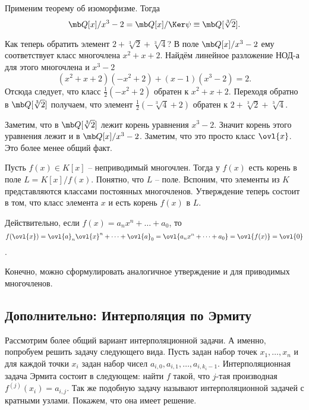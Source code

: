 Применим теорему об изоморфизме. Тогда $$\mb Q[x]/x^3-2= \mb Q[x]/\Ker \psi \equiv \mb Q[\sqrt[3]{2}].$$

Как теперь обратить элемент $2+\sqrt[3]{2} + \sqrt[3]{4}$? В поле  $\mb Q[x]/x^3-2$ ему соответствует класс многочлена $x^2+x+2$. Найдём линейное разложение НОД-а для этого многочлена и $x^3-2$ 
$$(x^2+x+2)(-x^2+2)+(x-1)(x^3-2)=2.$$
Отсюда следует, что класс $\frac{1}{2}(-x^2+2)$ обратен к $x^2+x+2$. Переходя обратно в $\mb Q[\sqrt[3]{2}]$ получаем, что элемент $\frac{1}{2}(-\sqrt[3]{4}+2)$ обратен к $2+\sqrt[3]{2} + \sqrt[3]{4}$.

Заметим, что в $\mb Q[\sqrt[3]{2}]$ лежит корень уравнения $x^3-2$. Значит корень этого уравнения лежит и в $\mb Q[x]/x^3-2$. Заметим, что это просто класс $\ovl{x}$. Это более менее общий факт.



 Пусть $f(x)\in K[x]$ -- неприводимый многочлен. Тогда у $f(x)$ есть корень в поле $L=K[x]/f(x)$.
\eutv
\proof Понятно, что $L$ -- поле. Вспоним, что элементы из $K$ представляются классами постоянных многочленов. 
Утверждение теперь состоит в том, что класс элемента $x$ и есть корень $f(x)$ в $L$.

Действительно, если $f(x)=a_nx^n+\dots+a_0$, то $$f(\ovl{x})=\ovl{a}_n\ovl{x}^n+\dots+\ovl{a}_0=\ovl{a_nx^n+\dots+a_0}=\ovl{f(x)}=\ovl{0}$$.
\endproof

\rm Конечно, можно сформулировать аналогичное утверждение и для приводимых многочленов.
\erm






\subsection{Дополнительно: Интерполяция по Эрмиту}

Рассмотрим более общий вариант интерполяционной задачи. А именно, попробуем решить задачу следующего вида.
Пусть задан набор точек $x_1,\dots, x_n$ и для каждой точки $x_i$ задан набор чисел $a_{i,0}, a_{i,1},\dots , a_{i,k_i-1}$. Интерполяционная задача Эрмита состоит в следующем: найти $f$ такой, что $j$-тая производная $f^{(j)}(x_i)=a_{i,j}$. Так же подобную задачу называют интерполяционной задачей с кратными узлами. Покажем, что она имеет решение.



